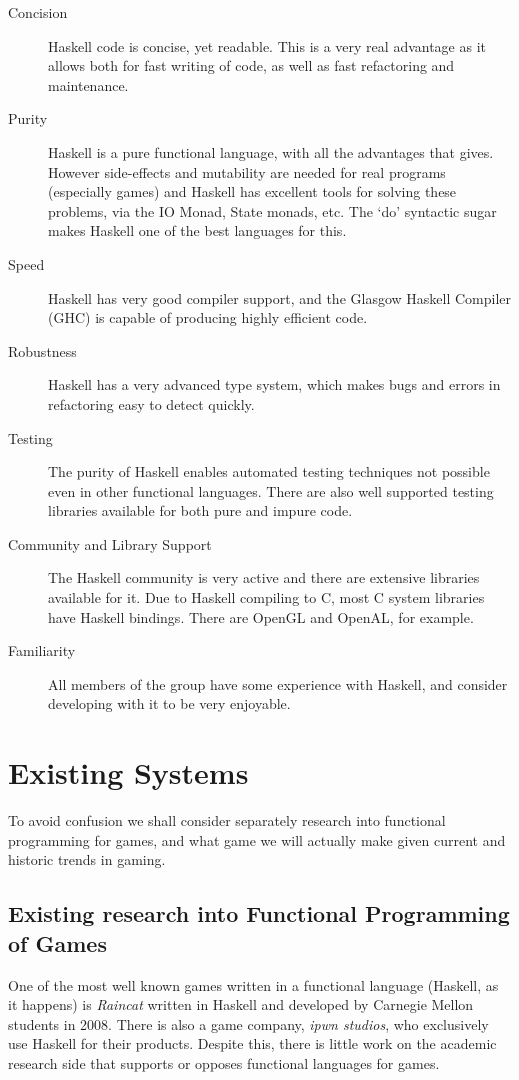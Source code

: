 \begin{description}
	\item[Concision] Haskell code is concise, yet readable. This is a very real advantage as it allows both for fast writing of code, as well as fast refactoring and maintenance. 
	\item[Purity] Haskell is a pure functional language, with all the advantages that gives. However side-effects and mutability are needed for real programs (especially games) and Haskell has excellent tools for solving these problems, via the IO Monad, State monads, etc. The `do' syntactic sugar makes Haskell one of the best languages for this.
	\item[Speed] Haskell has very good compiler support, and the Glasgow Haskell Compiler (GHC) is capable of producing highly efficient code. 
	\item[Robustness] Haskell has a very advanced type system, which makes bugs and errors in refactoring easy to detect quickly.
	\item[Testing] The purity of Haskell enables automated testing techniques not possible even in other functional languages. There are also well supported testing libraries available for both pure and impure code.
	\item[Community and Library Support] The Haskell community is very active and there are extensive libraries available for it. Due to Haskell compiling to C, most C system libraries have Haskell bindings. There are OpenGL and OpenAL, for example.
	\item[Familiarity] All members of the group have some experience with Haskell, and consider developing with it to be very enjoyable.
\end{description}

\section{Existing Systems}

To avoid confusion we shall consider separately research into functional programming for games, and what game we will actually make given current and historic trends in gaming.

\subsection{Existing research into Functional Programming of Games}

One of the most well known games written in a functional language (Haskell, as it happens) is \emph{Raincat} written in Haskell and developed by Carnegie Mellon students in 2008. There is also a game company, \emph{ipwn studios}, who exclusively use Haskell for their products. Despite this, there is little work on the academic research side that supports or opposes functional languages for games. 

